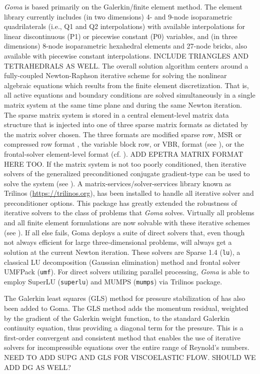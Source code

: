 \emph{Goma} is based primarily on the Galerkin/finite element method. The element library currently
includes (in two dimensions) 4- and 9-node isoparametric quadrilaterals (i.e., Q1 and Q2
interpolations) with available interpolations for linear discontinuous (P1) or piecewise constant
(P0) variables, and (in three dimensions) 8-node isoparametric hexahedral elements and 27-node
bricks, also available with piecewise constant interpolations. INCLUDE TRIANGLES AND TETRAHEDRALS AS WELL. The overall solution algorithm centers around a fully-coupled Newton-Raphson iterative scheme for solving the nonlinear algebraic equations which results from the finite element discretization. That is, all active equations and boundary conditions are solved simultaneously in a single matrix system at the same time plane and during the same Newton iteration. The sparse matrix system is stored in a
central element-level matrix data structure that is injected into one of three sparse matrix formats
as dictated by the matrix solver chosen. The three formats are modified sparse row, MSR or
compressed row format \citep{Aztec_SAND, iterative_solver_SAND}, the variable block
row, or VBR, format (see \citealt{VBR_SAND}), or the frontal-solver element-level format (cf. \citealt{HoodFrontal}). ADD EPETRA MATRIX FORMAT HERE TOO. If the matrix system is not too poorly conditioned, then iterative solvers of the generalized preconditioned conjugate gradient-type can be used to solve the system (see \citealt{iterative_solver_SAND, Aztec_2_SAND}). A matrix-services/solver-services library known as Trilinos (\url{https://trilinos.org}), has been installed to handle all iterative solver and preconditioner options. This package has greatly extended the robustness of iterative solvers to the class of problems that \emph{Goma} solves. Virtually all problems and all finite element formulations are now solvable with these iterative schemes (see \citealt{Goma_iterative_solver}). If all else fails, Goma deploys a suite of direct solvers that, even though not always efficient for large three-dimensional problems, will always get a solution at the current Newton iteration. These solvers are Sparse 1.4 (\texttt{lu}), a classical LU decomposition (Gaussian elimination) method and frontal solver UMFPack (\texttt{umf}). For direct solvers utilizing parallel processing, \emph{Goma} is able to employ SuperLU (\texttt{superlu}) and MUMPS (\texttt{mumps}) via Trilinos package.

The Galerkin least squares (GLS) method for pressure stabilization of \cite{PSPG}
has also been added to Goma. The GLS method adds the momentum residual, weighted by the
gradient of the Galerkin weight function, to the standard Galerkin continuity equation, thus
providing a diagonal term for the pressure. This is a first-order convergent and consistent method that enables the use of iterative solvers for incompressible equations over the entire range of Reynold’s numbers. NEED TO ADD SUPG AND GLS FOR VISCOELASTIC FLOW. SHOULD WE ADD DG AS WELL?

